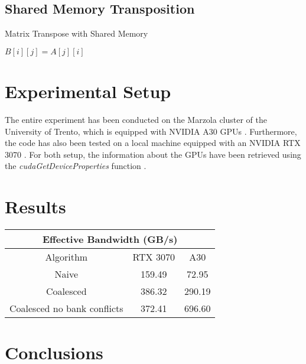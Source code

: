 \documentclass[]{IEEEconf}
\begin{document}
\subsection{Shared Memory Transposition}
\begin{algorithm}
    \caption{Matrix Transpose with Shared Memory}
    \begin{algorithmic}[1]
                    \State $B[i][j] = A[j][i]$
                \EndFor
            \EndFor
        \EndProcedure
    \end{algorithmic}
\end{algorithm}

\section{Experimental Setup}
The entire experiment has been conducted on the Marzola cluster of the University of Trento, 
which is equipped with NVIDIA A30 GPUs \cite{nvidia:a30}.
Furthermore, the code has also been tested on a local machine equipped with an NVIDIA RTX 3070 \cite{nvidia:rtx3070}.
For both setup, the information about the GPUs have been retrieved using the \textit{cudaGetDeviceProperties} function \cite{nvidia:cudaDeviceProp}.
\section{Results}
\begin{table}
    \centering
    \begin{tabular}{|c|c|c|}
        \hline
        \multicolumn{3}{|c|}{\textbf{Effective Bandwidth (GB/s)}} \\
        \hline
        Algorithm & RTX 3070 & A30 \\ \hline
        Naive & 159.49 & 72.95 \\ \hline
        Coalesced & 386.32 & 290.19 \\ \hline
        Coalesced no bank conflicts & 372.41 & 696.60 \\ \hline
    \end{tabular}  
\end{table}
\section{Conclusions}



\end{document}
